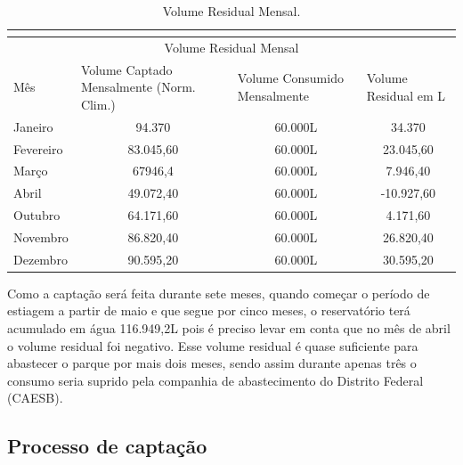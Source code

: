 \begin{table}[h]
\centering
\caption{Volume Residual Mensal.}
\label{Volume Residual Mensal.}
\begin{tabular}{lccc}
 & \multicolumn{1}{l}{} & \multicolumn{1}{l}{} & \multicolumn{1}{l}{} \\ \hline
\multicolumn{4}{|c|}{Volume Residual Mensal} \\ \hline
\multicolumn{1}{|l|}{Mês} & \multicolumn{1}{l|}{Volume Captado Mensalmente (Norm. Clim.)} & \multicolumn{1}{l|}{Volume Consumido Mensalmente} & \multicolumn{1}{l|}{Volume Residual em L} \\ \hline
\multicolumn{1}{|l|}{Janeiro} & \multicolumn{1}{c|}{94.370} & \multicolumn{1}{c|}{60.000L} & \multicolumn{1}{c|}{34.370} \\ \hline
\multicolumn{1}{|l|}{Fevereiro} & \multicolumn{1}{c|}{83.045,60} & \multicolumn{1}{c|}{60.000L} & \multicolumn{1}{c|}{23.045,60} \\ \hline
\multicolumn{1}{|l|}{Março} & \multicolumn{1}{c|}{67946,4} & \multicolumn{1}{c|}{60.000L} & \multicolumn{1}{c|}{7.946,40} \\ \hline
\multicolumn{1}{|l|}{Abril} & \multicolumn{1}{c|}{49.072,40} & \multicolumn{1}{c|}{60.000L} & \multicolumn{1}{c|}{-10.927,60} \\ \hline
\multicolumn{1}{|l|}{Outubro} & \multicolumn{1}{c|}{64.171,60} & \multicolumn{1}{c|}{60.000L} & \multicolumn{1}{c|}{4.171,60} \\ \hline
\multicolumn{1}{|l|}{Novembro} & \multicolumn{1}{c|}{86.820,40} & \multicolumn{1}{c|}{60.000L} & \multicolumn{1}{c|}{26.820,40} \\ \hline
\multicolumn{1}{|l|}{Dezembro} & \multicolumn{1}{c|}{90.595,20} & \multicolumn{1}{c|}{60.000L} & \multicolumn{1}{c|}{30.595,20} \\ \hline
\end{tabular}
\end{table}

Como a captação será feita durante sete meses, quando começar o período de estiagem a partir de maio e que segue por cinco meses, o reservatório terá acumulado em água 116.949,2L pois é preciso levar em conta que no mês de abril o volume residual foi negativo. Esse volume residual é quase suficiente para abastecer o parque por mais dois meses, sendo assim durante apenas três o consumo seria suprido pela companhia de abastecimento do Distrito Federal (CAESB).

\subsection{Processo de captação}

